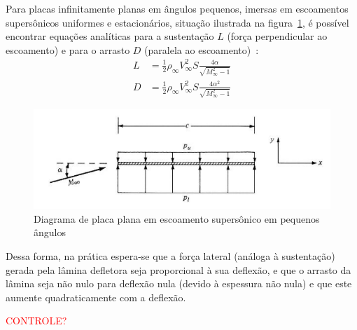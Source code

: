 Para placas infinitamente planas em ângulos pequenos, imersas em escoamentos supersônicos uniformes e estacionários, situação ilustrada na figura~\ref{fig:supersonic_flat_plate}, é possível encontrar equações analíticas para a sustentação \(L\) (força perpendicular ao escoamento) e para o arrasto \(D\) (paralela ao escoamento)~\cite{anderson}:
\begin{align}
    L &= \frac{1}{2} \rho_\infty V_\infty^2 S \frac{4\alpha}{\sqrt{M_\infty^2-1}} \\
    D &= \frac{1}{2} \rho_\infty V_\infty^2 S \frac{4\alpha^2}{\sqrt{M_\infty^2-1}}
\end{align}

\begin{figure}[htbp]
    \centering
    \includegraphics[width=\textwidth]{img/supersonic_flat_plate.png}
    \caption{Diagrama de placa plana em escoamento supersônico em pequenos ângulos}\label{fig:supersonic_flat_plate}
\end{figure}

Dessa forma, na prática espera-se que a força lateral (análoga à sustentação) gerada pela lâmina defletora seja proporcional à sua deflexão, e que o arrasto da lâmina seja não nulo para deflexão nula (devido à espessura não nula) e que este aumente quadraticamente com a deflexão.

\textcolor{red}{CONTROLE?}
